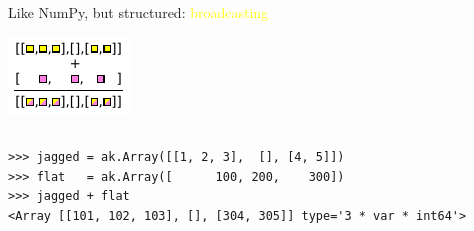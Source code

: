 \documentclass[aspectratio=169]{beamer}
\begin{document}
\begin{frame}[fragile]{Like NumPy, but structured: \textcolor{yellow}{broadcasting}}
\begin{center}
\includegraphics[width=0.4\linewidth]{img/cartoon-broadcasting.pdf}
\end{center}

\begin{columns}
\begin{verbatim}
>>> jagged = ak.Array([[1, 2, 3],  [], [4, 5]])
>>> flat   = ak.Array([      100, 200,    300])
>>> jagged + flat
<Array [[101, 102, 103], [], [304, 305]] type='3 * var * int64'>
\end{verbatim}
\end{columns}
\end{frame}
\end{document}
